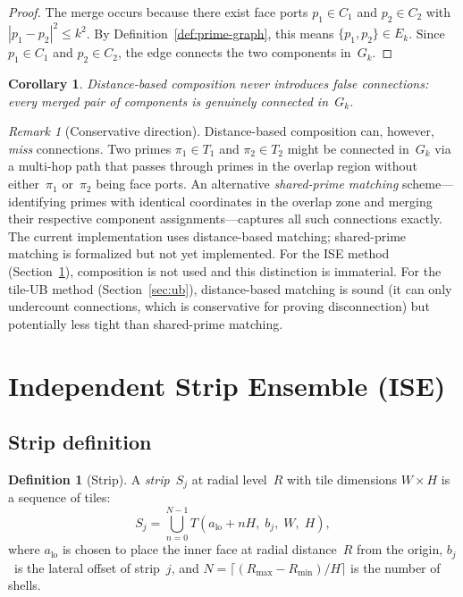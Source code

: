\documentclass[11pt,a4paper]{article}
\newcommand{\Gk}{G_k}
\theoremstyle{definition}
\newtheorem{definition}{Definition}[section]
\theoremstyle{plain}
\newtheorem{corollary}[theorem]{Corollary}
\theoremstyle{remark}
\newtheorem{remark}[theorem]{Remark}
\begin{document}
\begin{proof}
The merge occurs because there exist face ports $p_1 \in C_1$ and $p_2 \in C_2$ with $|p_1 - p_2|^2 \le k^2$.  By Definition~\ref{def:prime-graph}, this means $\{p_1, p_2\} \in E_k$.  Since $p_1 \in C_1$ and $p_2 \in C_2$, the edge connects the two components in~$\Gk$.
\end{proof}

\begin{corollary}\label{cor:no-false-connections}
Distance-based composition never introduces false connections: every merged pair of components is genuinely connected in~$\Gk$.
\end{corollary}

\begin{remark}[Conservative direction]\label{rem:conservative}
Distance-based composition can, however, \emph{miss} connections.  Two primes $\pi_1 \in T_1$ and $\pi_2 \in T_2$ might be connected in~$\Gk$ via a multi-hop path that passes through primes in the overlap region without either~$\pi_1$ or~$\pi_2$ being face ports.  An alternative \emph{shared-prime matching} scheme---identifying primes with identical coordinates in the overlap zone and merging their respective component assignments---captures all such connections exactly.  The current implementation uses distance-based matching; shared-prime matching is formalized but not yet implemented.  For the ISE method (Section~\ref{sec:ise}), composition is not used and this distinction is immaterial.  For the tile-UB method (Section~\ref{sec:ub}), distance-based matching is sound (it can only undercount connections, which is conservative for proving disconnection) but potentially less tight than shared-prime matching.
\end{remark}


\section{Independent Strip Ensemble (ISE)}\label{sec:ise}

\subsection{Strip definition}

\begin{definition}[Strip]\label{def:strip}
A \emph{strip}~$S_j$ at radial level~$R$ with tile dimensions $W \times H$ is a sequence of tiles:
\[
  S_j = \bigcup_{n=0}^{N-1} T(a_{\text{lo}} + nH,\; b_j,\; W,\; H),
\]
where $a_{\text{lo}}$ is chosen to place the inner face at radial distance~$R$ from the origin, $b_j$~is the lateral offset of strip~$j$, and $N = \lceil(R_{\max} - R_{\min})/H\rceil$ is the number of shells.
\end{definition}
\end{document}
